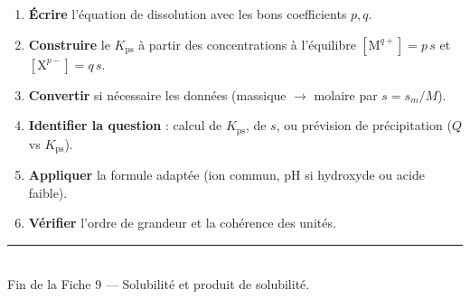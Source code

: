 \documentclass[11pt,a4paper]{article}
\newcommand{\Kps}{K_{\mathrm{ps}}}
\begin{document}
\begin{tcolorbox}[boxbase,colback=methcol!8,colframe=methcol,sharp corners,
   title={\textsc{Méthode générale — résoudre un problème de solubilité}}]
\begin{enumerate}[leftmargin=1.8em,topsep=2pt,itemsep=2pt]
  \item \textbf{Écrire} l'équation de dissolution avec les bons coefficients $p,q$.
  \item \textbf{Construire} le $\Kps$ à partir des concentrations à l'équilibre
        $[\mathrm{M}^{q+}]=p\,s$ et $[\mathrm{X}^{p-}]=q\,s$.
  \item \textbf{Convertir} si nécessaire les données (massique $\to$ molaire par $s=s_m/M$).
  \item \textbf{Identifier la question} : calcul de $\Kps$, de $s$, ou prévision de précipitation
        ($Q$ vs $\Kps$).
  \item \textbf{Appliquer} la formule adaptée (ion commun, pH si hydroxyde ou acide faible).
  \item \textbf{Vérifier} l'ordre de grandeur et la cohérence des unités.
\end{enumerate}
\end{tcolorbox}

\vfill
\begin{center}
\textcolor{primary}{\rule{0.5\textwidth}{1pt}}\\[4pt]
{\small\color{black!60}Fin de la Fiche 9 — Solubilité et produit de solubilité.}
\end{center}
\end{document}
